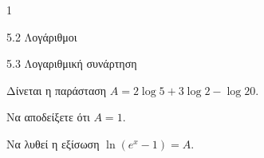 \begin{ylh}{1}
\item 5.2 Λογάριθμοι
\item 5.3 Λογαριθμική συνάρτηση
\end{ylh}
Δίνεται η παράσταση $A = 2\log 5 + 3\log 2 - \log 20$.
\begin{alist}
\item Να αποδείξετε ότι $A = 1$.
\item Να λυθεί η εξίσωση $\ln(e^x - 1) = A$.
\end{alist}

